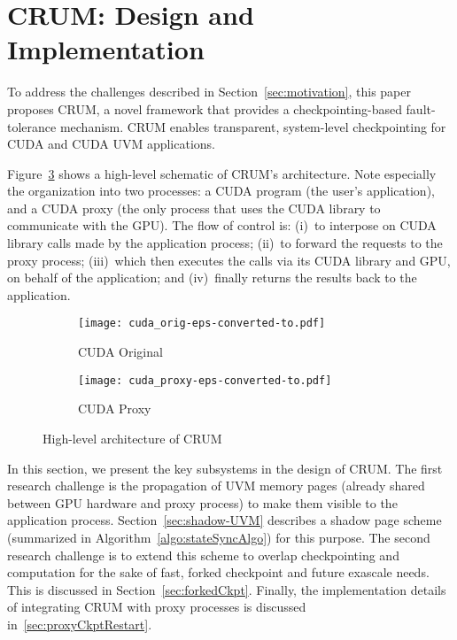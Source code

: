 \documentclass[11pt]{article}
\begin{document}
\section{CRUM: Design and Implementation}
\label{sec:design}


To address the challenges described in Section~\ref{sec:motivation}, this
paper proposes CRUM, a novel framework that provides a checkpointing-based
fault-tolerance mechanism. CRUM enables transparent, system-level
checkpointing for CUDA and CUDA UVM applications.

Figure~\ref{fig:cuda-orig-proxy} shows a high-level schematic of CRUM's
architecture. Note especially the organization into two processes:  a
CUDA program (the user's application), and a CUDA proxy (the only process
that uses the CUDA library to communicate with the GPU).  The flow of
control is: (i)~to interpose on CUDA library calls made by the application
process; (ii)~to forward the requests to the proxy process; (iii)~which
then executes the calls via its CUDA library and GPU, on behalf of the
application; and (iv)~finally returns the results back to the application.

\begin{figure}[ht]
  \centering
        \begin{subfigure}[t]{0.48\textwidth}
                \centering
                \texttt{[image: cuda\_orig-eps-converted-to.pdf]}
                \caption{CUDA Original} \label{fig:cuda-orig}
                \vspace{6mm}
        \end{subfigure}
        \begin{subfigure}[t]{0.48\textwidth}
                \centering
                \texttt{[image: cuda\_proxy-eps-converted-to.pdf]}
                \caption{CUDA Proxy} \label{fig:cuda-proxy}
        \end{subfigure}
        \caption{High-level architecture of CRUM}
        \label{fig:cuda-orig-proxy}
\end{figure}

In this section, we present the key subsystems in the design
of CRUM.  The first research challenge is the propagation of UVM
memory pages (already shared between GPU hardware and proxy process)
to make them visible to the application process.
Section~\ref{sec:shadow-UVM} describes a shadow page scheme
(summarized in Algorithm~\ref{algo:stateSyncAlgo})
for this purpose.  The second research challenge is to extend
this scheme to overlap checkpointing and computation for the
sake of fast, forked checkpoint and future exascale needs.
This is discussed in Section~\ref{sec:forkedCkpt}.
Finally, the implementation details of integrating CRUM
with proxy processes is discussed in~\ref{sec:proxyCkptRestart}.
\end{document}
